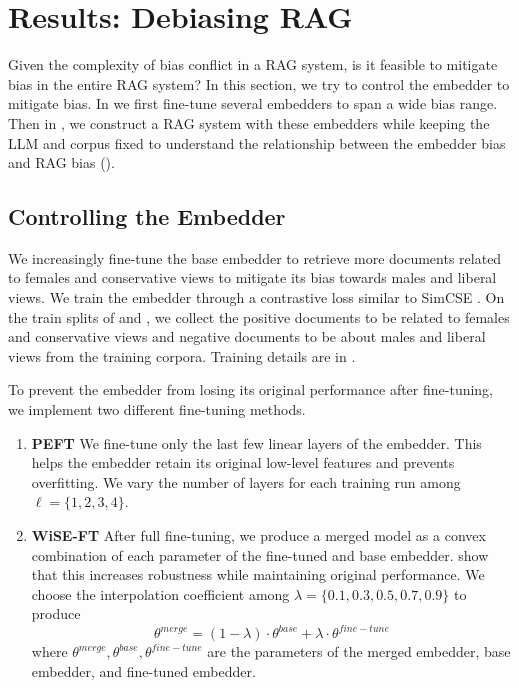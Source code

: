 \section{Results: Debiasing RAG} 
\label{sec:debiasing}



Given the complexity of bias conflict in a RAG system, is it feasible to mitigate bias in the entire RAG system? In this section, we try to control the embedder to mitigate bias. In  we first fine-tune several embedders to span a wide bias range. Then in , we construct a RAG system with these embedders while keeping the LLM and corpus fixed to understand the relationship between the embedder bias and RAG bias (). 

\subsection{Controlling the Embedder}
\label{sec:fine-tune}
We increasingly fine-tune the base embedder to retrieve more documents related to females and conservative views to mitigate its bias towards males and liberal views. We train the embedder through a contrastive loss similar to SimCSE \cite{gao2021simcse}. On the train splits of \genderData and \politicalData, we collect the positive documents to be related to females and conservative views and negative documents to be about males and liberal views from the training corpora. Training details are in . 

To prevent the embedder from losing its original performance after fine-tuning, we implement two different fine-tuning methods.

\begin{enumerate}
    \item \textbf{PEFT} We fine-tune only the last few linear layers of the embedder. This helps the embedder retain its original low-level features and prevents overfitting. We vary the number of layers for each training run among $\ell = \{1, 2, 3, 4\}$.
    \item \textbf{WiSE-FT} After full fine-tuning, we produce a merged model as a convex combination of each parameter of the fine-tuned and base embedder. \citet{wortsman2022robust} show that this increases robustness while maintaining original performance. We choose the interpolation coefficient among $\lambda=\{0.1, 0.3, 0.5, 0.7, 0.9\}$ to produce 
    \[
    \theta^{merge} = (1-\lambda)\cdot\theta^{base} + \lambda\cdot\theta^{fine-tune}
    \]
    where $\theta^{merge}, \theta^{base}, \theta^{fine-tune}$ are the parameters of the merged embedder, base embedder, and fine-tuned embedder.
\end{enumerate}

